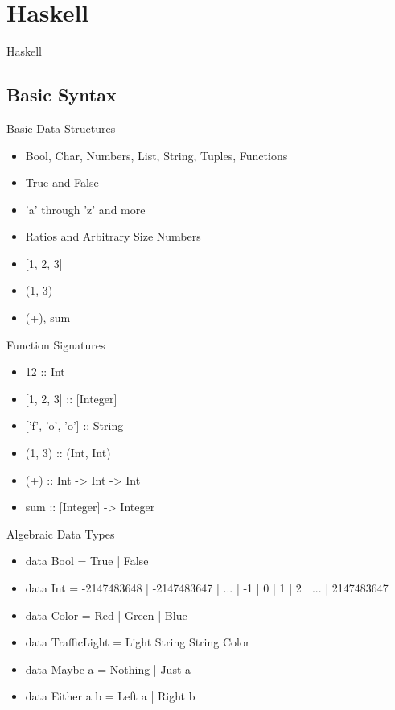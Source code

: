 \documentclass{beamer}                  %
\newcommand{\srule}{
	\rule{\textwidth}{1pt}\\
}
\newlength{\subsecwidth}
\newenvironment{slide}{
	\begin{frame} %
	\settowidth{\subsecwidth}{\insertsubsection} %
	\ifthenelse{\dimtest{\subsecwidth}{<}{1pt}}{ %
		\frametitle{\insertsection\\             %
		\vspace{-1ex}                            %
		\color{fore}\srule                       %
		\par                                     %
		\vspace{-3ex}                            %
		}
	}{                                           %
		\frametitle{\insertsection\ -- \insertsubsection\\ %
		\vspace{-1ex}                            %
		\color{fore}\srule                       %
		\par                                     %
		\vspace{-3ex}                            %
		}
	}
	\Large                                       %
}{
	\end{frame}
}
\newcommand{\titleslide}[1]{
	\section{#1}             %
	\begin{slide}
		\begin{center}
			\color{comments}
			\Huge            %
			#1               %
		\end{center}
	\end{slide}
}
\begin{document}
\titleslide{Haskell}

\subsection{Basic Syntax}

\begin{slide}
  Basic Data Structures
  \begin{itemize}
    \item Bool, Char, Numbers, List, String, Tuples, Functions
    \item True and False
    \item 'a' through 'z' and more
    \item Ratios and Arbitrary Size Numbers
    \item{}{} [1, 2, 3]
    \item (1, 3)
    \item (+), sum
  \end{itemize}
\end{slide}

\begin{slide}
  Function Signatures
  \begin{itemize}
    \item 12 :: Int
    \item{}{} [1, 2, 3] :: [Integer]
    \item{}{} ['f', 'o', 'o'] :: String
    \item (1, 3) :: (Int, Int)
    \item (+) :: Int -> Int -> Int
    \item sum :: [Integer] -> Integer
  \end{itemize}
\end{slide}

\begin{slide}
  Algebraic Data Types
  \begin{itemize}
    \item data Bool = True | False
    \item data Int = -2147483648 | -2147483647 | ... | -1 | 0 | 1 | 2 | ... | 2147483647
    \item data Color = Red | Green | Blue
    \item data TrafficLight = Light String String Color
    \item data Maybe a = Nothing | Just a
    \item data Either a b = Left a | Right b
  \end{itemize}
\end{slide}
\end{document}
